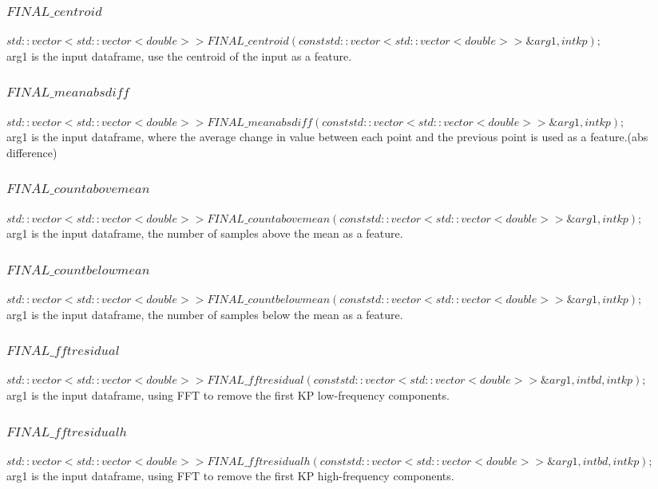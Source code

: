 \documentclass{article}
\begin{document}
\begin{CJK}{UTF8}{gbsn}
\begin{spacing}{1.5}
\subsubsection{$FINAL\_centroid$}
$std::vector<std::vector<double>> FINAL\_centroid(const std::vector<std::vector<double>> \&arg1, int kp) ;$\\
arg1 is the input dataframe, use the centroid of the input as a feature.

\subsubsection{$FINAL\_meanabsdiff$}
$std::vector<std::vector<double>> FINAL\_meanabsdiff(const std::vector<std::vector<double>> \&arg1, int kp) ;$\\
arg1 is the input dataframe, where the average change in value between each point and the previous point is used as a feature.(abs difference)

\subsubsection{$FINAL\_countabovemean$}
$std::vector<std::vector<double>> FINAL\_countabovemean(const std::vector<std::vector<double>> \&arg1, int kp) ;$\\
arg1 is the input dataframe, the number of samples above the mean as a feature.
\subsubsection{$FINAL\_countbelowmean$}
$std::vector<std::vector<double>> FINAL\_countbelowmean(const std::vector<std::vector<double>> \&arg1, int kp) ;$\\
arg1 is the input dataframe, the number of samples below the mean as a feature.
\subsubsection{$FINAL\_fftresidual$}
$std::vector<std::vector<double>> FINAL\_fftresidual(const std::vector<std::vector<double>> \&arg1, int bd, int kp) ;$\\
arg1 is the input dataframe, using FFT to remove the first KP low-frequency components.
\subsubsection{$FINAL\_fftresidualh$}
$std::vector<std::vector<double>> FINAL\_fftresidualh(const std::vector<std::vector<double>> \&arg1, int bd, int kp) ;$\\
arg1 is the input dataframe, using FFT to remove the first KP high-frequency components.

\end{spacing}
\end{CJK}
\end{document}

